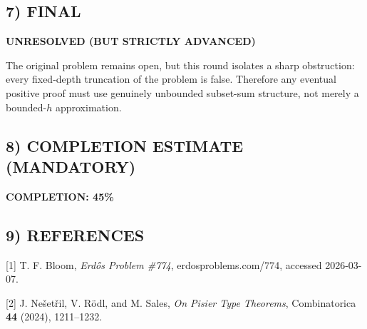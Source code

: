 \subsection*{7) FINAL}
\textbf{UNRESOLVED (BUT STRICTLY ADVANCED)}

The original problem remains open, but this round isolates a sharp obstruction: every fixed-depth truncation of the problem is false. Therefore any eventual positive proof must use genuinely unbounded subset-sum structure, not merely a bounded-$h$ approximation.

\subsection*{8) COMPLETION ESTIMATE (MANDATORY)}
\textbf{COMPLETION: 45\%}

\subsection*{9) REFERENCES}
[1] T. F. Bloom, \emph{Erd\H{o}s Problem \#774}, erdosproblems.com/774, accessed 2026-03-07.

[2] J. Ne\v{s}et\v{r}il, V. R\"odl, and M. Sales, \emph{On Pisier Type Theorems}, Combinatorica \textbf{44} (2024), 1211--1232.

